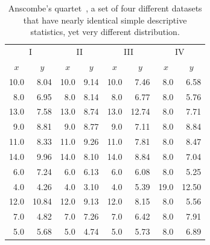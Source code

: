 \begin{table}[ht]
\centering
\caption{Anscombe's quartet~\citep{anscombe1973}, a set of four different datasets that have nearly identical simple descriptive statistics, yet very different distribution.}
\label{tab:anscombe}
\begin{tabular}{rr|rr|rr|rr}
\toprule
\multicolumn{2}{c|}{I} & \multicolumn{2}{c|}{II} & \multicolumn{2}{c|}{III} & \multicolumn{2}{c}{IV} \\

\multicolumn{1}{c}{$x$} & \multicolumn{1}{c|}{$y$} & \multicolumn{1}{c}{$x$} & \multicolumn{1}{c|}{$y$} & \multicolumn{1}{c}{$x$} & \multicolumn{1}{c|}{$y$} & \multicolumn{1}{c}{$x$} & \multicolumn{1}{c}{$y$} \\
\midrule
10.0 & 8.04 & 10.0 & 9.14 & 10.0 & 7.46 & 8.0 & 6.58 \\
8.0 & 6.95 & 8.0 & 8.14 & 8.0 & 6.77 & 8.0 & 5.76 \\
13.0 & 7.58 & 13.0 & 8.74 & 13.0 & 12.74 & 8.0 & 7.71 \\
9.0 & 8.81 & 9.0 & 8.77 & 9.0 & 7.11 & 8.0 & 8.84 \\
11.0 & 8.33 & 11.0 & 9.26 & 11.0 & 7.81 & 8.0 & 8.47 \\
14.0 & 9.96 & 14.0 & 8.10 & 14.0 & 8.84 & 8.0 & 7.04 \\
6.0 & 7.24 & 6.0 & 6.13 & 6.0 & 6.08 & 8.0 & 5.25 \\
4.0 & 4.26 & 4.0 & 3.10 & 4.0 & 5.39 & 19.0 & 12.50 \\
12.0 & 10.84 & 12.0 & 9.13 & 12.0 & 8.15 & 8.0 & 5.56 \\
7.0 & 4.82 & 7.0 & 7.26 & 7.0 & 6.42 & 8.0 & 7.91 \\
5.0 & 5.68 & 5.0 & 4.74 & 5.0 & 5.73 & 8.0 & 6.89 \\
\bottomrule
\end{tabular}
\end{table}


